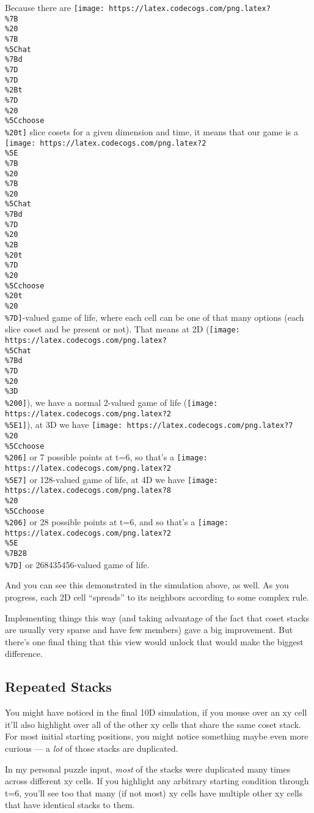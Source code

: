 \documentclass[]{article}
\begin{document}
Because there are
\texttt{[image: https://latex.codecogs.com/png.latex?\\\%7B\\\%20\\\%7B\\\%5Chat\\\%7Bd\\\%7D\\\%7D\\\%2Bt\\\%7D\\\%20\\\%5Cchoose\\\%20t]}
slice cosets for a given dimension and time, it means that our game is a
\texttt{[image: https://latex.codecogs.com/png.latex?2\\\%5E\\\%7B\\\%20\\\%7B\\\%20\\\%5Chat\\\%7Bd\\\%7D\\\%20\\\%2B\\\%20t\\\%7D\\\%20\\\%5Cchoose\\\%20t\\\%20\\\%7D]}-valued
game of life, where each cell can be one of that many options (each slice coset
and be present or not). That means at 2D
(\texttt{[image: https://latex.codecogs.com/png.latex?\\\%5Chat\\\%7Bd\\\%7D\\\%20\\\%3D\\\%200]}),
we have a normal 2-valued game of life
(\texttt{[image: https://latex.codecogs.com/png.latex?2\\\%5E1]}), at 3D we have
\texttt{[image: https://latex.codecogs.com/png.latex?7\\\%20\\\%5Cchoose\\\%206]} or 7
possible points at t=6, so that's a
\texttt{[image: https://latex.codecogs.com/png.latex?2\\\%5E7]} or 128-valued game
of life, at 4D we have
\texttt{[image: https://latex.codecogs.com/png.latex?8\\\%20\\\%5Cchoose\\\%206]} or
28 possible points at t=6, and so that's a
\texttt{[image: https://latex.codecogs.com/png.latex?2\\\%5E\\\%7B28\\\%7D]} or
268435456-valued game of life.

And you can see this demonstrated in the simulation above, as well. As you
progress, each 2D cell ``spreads'' to its neighbors according to some complex
rule.

Implementing things this way (and taking advantage of the fact that coset stacks
are usually very sparse and have few members) gave a big improvement. But
there's one final thing that this view would unlock that would make the biggest
difference.

\hypertarget{repeated-stacks}{%
\subsection{Repeated Stacks}\label{repeated-stacks}}

You might have noticed in the final 10D simulation, if you mouse over an xy cell
it'll also highlight over all of the other xy cells that share the same coset
stack. For most initial starting positions, you might notice something maybe
even more curious --- a \emph{lot} of those stacks are duplicated.

In my personal puzzle input, \emph{most} of the stacks were duplicated many
times across different xy cells. If you highlight any arbitrary starting
condition through t=6, you'll see too that many (if not most) xy cells have
multiple other xy cells that have identical stacks to them.
\end{document}
